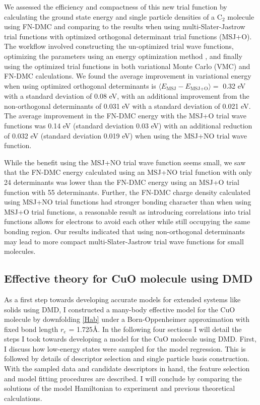 \documentclass[12pt]{article}
\begin{document}
We assessed the efficiency and compactness of this new trial function by calculating the ground state energy and single particle densities of a C$_2$ molecule using FN-DMC and comparing to the results when using multi-Slater-Jastrow trial functions with optimized orthogonal determinant trial functions (MSJ+O). 
The workflow involved constructing the un-optimized trial wave functions, optimizing the parameters using an energy optimization method \cite{Toulouse2007}, and finally using the optimized trial functions in both variational Monte Carlo (VMC) and FN-DMC calculations. 
We found the average improvement in variational energy when using optimized orthogonal determinants is $\langle E_\text{MSJ} - E_\text{MSJ+O} \rangle = $ 0.32 eV with a standard deviation of 0.08 eV, with an additional improvement from the non-orthogonal determinants of 0.031 eV with a standard deviation of 0.021 eV.
The average improvement in the FN-DMC energy with the MSJ+O trial wave functions was 0.14 eV (standard deviation 0.03 eV) with an additional reduction of 0.032 eV (standard deviation 0.019 eV) when using the MSJ+NO trial wave function.

While the benefit using the MSJ+NO trial wave function seems small, we saw that the FN-DMC energy calculated using an MSJ+NO trial function with only 24 determinants was lower than the FN-DMC energy using an MSJ+O trial function with 55 determinants.
Further, the FN-DMC charge density calculated using MSJ+NO trial functions had stronger bonding character than when using MSJ+O trial functions, a reasonable result as introducing correlations into trial functions allows for electrons to avoid each other while still occupying the same bonding region. 
Our results indicated that using non-orthogonal determinants may lead to more compact multi-Slater-Jastrow trial wave functions for small molecules.

\subsection{Effective theory for CuO molecule using DMD}
As a first step towards developing accurate models for extended systems like solids using DMD, I constructed a many-body effective model for the CuO molecule by downfolding \eqref{Hab} under a Born-Oppenheimer approximation with fixed bond length $r_e$ = 1.725\r{A}.
In the following four sections I will detail the steps I took towards developing a model for the CuO molecule using DMD.
First, I discuss how low-energy states were sampled for the model regression.
This is followed by details of descriptor selection and single particle basis construction.
With the sampled data and candidate descriptors in hand, the feature selection and model fitting procedures are described.
I will conclude by comparing the solutions of the model Hamiltonian to experiment and previous theoretical calculations.
\end{document}
